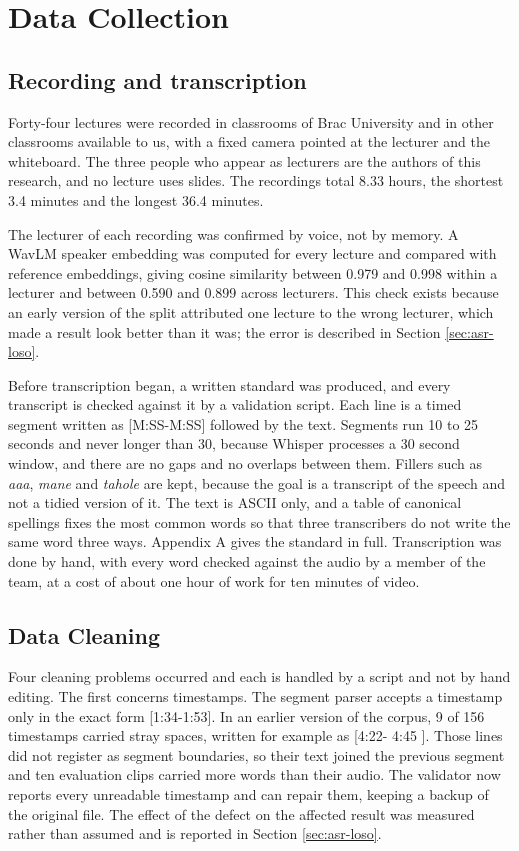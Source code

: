 \section{Data Collection}
\label{sec:data-collection}

\subsection{Recording and transcription}

Forty-four lectures were recorded in classrooms of Brac University and in other
classrooms available to us, with a fixed camera pointed at the lecturer and the
whiteboard. The three people who appear as lecturers are the authors of this research, and
no lecture uses slides. The recordings total 8.33 hours, the shortest 3.4 minutes and the
longest 36.4 minutes.

The lecturer of each recording was confirmed by voice, not by memory. A WavLM
speaker embedding was computed for every lecture and compared with reference embeddings,
giving cosine similarity between 0.979 and 0.998 within a lecturer and between 0.590 and
0.899 across lecturers. This check exists because an early version of the split
attributed one lecture to the wrong lecturer, which made a result look better than it
was; the error is described in Section \ref{sec:asr-loso}.

Before transcription began, a written standard was produced, and every transcript is
checked against it by a validation script. Each line is a timed segment written as
[M:SS-M:SS] followed by the text. Segments run 10 to 25 seconds and never longer
than 30, because Whisper processes a 30 second window, and there are no gaps and no
overlaps between them. Fillers such as \textit{aaa}, \textit{mane} and \textit{tahole} are
kept, because the goal is a transcript of the speech and not a tidied version of it.
The text is ASCII only, and a table of canonical spellings fixes the most common words so
that three transcribers do not write the same word three ways. Appendix A gives the
standard in full. Transcription was done by hand, with every
word checked against the audio by a member of the team, at a cost of about one hour of
work for ten minutes of video.

\subsection{Data Cleaning}

Four cleaning problems occurred and each is handled by a script and not by hand editing. The first concerns timestamps. The segment parser accepts a timestamp only in
the exact form [1:34-1:53]. In an
earlier version of the corpus, 9 of 156 timestamps carried stray spaces, written for
example as [4:22- 4:45 ]. Those lines did not register as segment boundaries, so
their text joined the previous segment and ten evaluation clips carried more words than
their audio. The validator now reports every unreadable timestamp and can repair them,
keeping a backup of the original file. The effect of the defect on the affected result
was measured rather than assumed and is reported in Section \ref{sec:asr-loso}.

